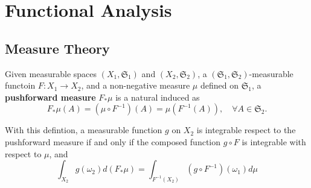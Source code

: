 \section{Functional Analysis}

\subsection{Measure Theory}

\begin{definition}
Given measurable spaces $(X_1,\mathfrak{S}_1)$ and $(X_2,\mathfrak{S}_2)$, a $(\mathfrak{S}_1,\mathfrak{S}_2)$-measurable functoin $F:X_1\to X_2$, and a non-negative measure $\mu$ defined on $\mathfrak{S}_1$, a \textbf{pushforward measure} $F_*\mu$ is a natural induced as
\begin{equation}
F_*\mu(A) = (\mu\circ F^{-1})(A)=\mu\left(F^{-1}(A)\right), \quad \forall A\in\mathfrak{S}_2.
\end{equation} 
\end{definition}
With this defintion, a measurable function $g$ on $X_2$ is integrable respect to the pushforward measure if and only if the composed function $g\circ F$ is integrable with respect to $\mu$, and
\begin{equation}
\int_{X_2}g(\omega_2)d(F_*\mu) = \int_{F^{-1}(X_2)}(g\circ F^{-1})(\omega_1) d\mu
\end{equation}
